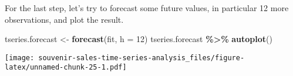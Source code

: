 \documentclass[
]{article}
\newenvironment{Shaded}{\begin{snugshade}}{\end{snugshade}}
\newcommand{\AttributeTok}[1]{\textcolor[rgb]{0.13,0.29,0.53}{#1}}
\newcommand{\DecValTok}[1]{\textcolor[rgb]{0.00,0.00,0.81}{#1}}
\newcommand{\FunctionTok}[1]{\textcolor[rgb]{0.13,0.29,0.53}{\textbf{#1}}}
\newcommand{\NormalTok}[1]{#1}
\newcommand{\OtherTok}[1]{\textcolor[rgb]{0.56,0.35,0.01}{#1}}
\newcommand{\SpecialCharTok}[1]{\textcolor[rgb]{0.81,0.36,0.00}{\textbf{#1}}}
\begin{document}
For the last step, let's try to forecast some future values, in
particular 12 more observations, and plot the result.

\begin{Shaded}
\begin{Highlighting}[]
\NormalTok{tseries.forecast }\OtherTok{\textless{}{-}} \FunctionTok{forecast}\NormalTok{(fit, }\AttributeTok{h =} \DecValTok{12}\NormalTok{)}
\NormalTok{tseries.forecast }\SpecialCharTok{\%\textgreater{}\%} \FunctionTok{autoplot}\NormalTok{()}
\end{Highlighting}
\end{Shaded}

\texttt{[image: souvenir-sales-time-series-analysis\_files/figure-latex/unnamed-chunk-25-1.pdf]}
\end{document}
